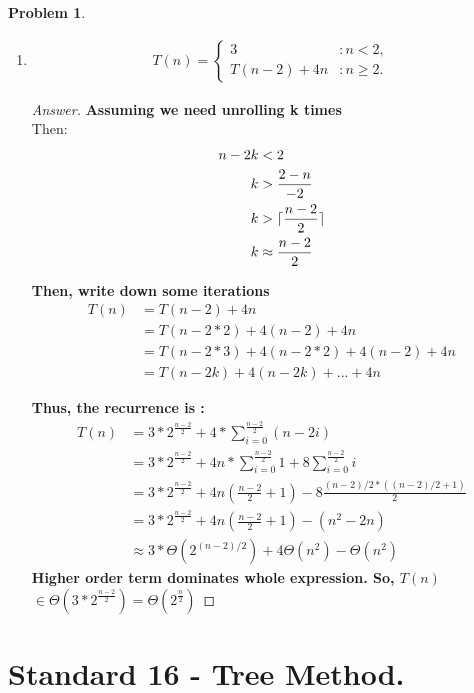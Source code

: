 \documentclass[11pt]{article}
\DeclarePairedDelimiter\ceil{\lceil}{\rceil}
\theoremstyle{definition}
\theoremstyle{definition}
\newtheorem{required}{Problem}
\theoremstyle{definition}
\begin{document}
\begin{required}
\begin{enumerate} [label=(\alph*)]
\newpage
\item
\begin{align*}
T(n) = \begin{cases}
3 & : n < 2, \\
T(n-2) + 4n & : n \geq 2.
\end{cases}
\end{align*}

\begin{proof}[Answer]
\textbf{Assuming we need unrolling k times\\}
Then:\\
\begin{align*}
n-2k &< 2 \\
k &>  \frac {2-n}{-2}\\
k &> \ceil{\frac{n-2}{2}}\\
k &\approx \frac{n-2}{2}
\end{align*}

\textbf{Then, write down some iterations\\}
\begin{align*}
T(n) &= T(n-2)+4n\\
&= T(n-2*2) + 4(n-2) + 4n\\
&= T(n-2*3) + 4(n-2*2) + 4(n-2) + 4n\\
&= T(n-2k) + 4(n-2k) + ... + 4n
\end{align*}

\textbf{Thus, the recurrence is :\\ }
\begin{align*}
T(n) &= 3 * 2^{\frac{n-2}{2}} +4 *  \sum_{i=0}^{\frac{n-2}{2}} (n-2i)\\
&=  3 * 2^{\frac{n-2}{2}} + 4n * \sum_{i=0}^{\frac{n-2}{2}} 1 +8\sum_{i=0}^{\frac{n-2}{2}} i\\
&=  3 * 2^{\frac{n-2}{2}} + 4n(\frac{n-2}{2} + 1) -8 \frac{(n-2)/2 * ((n-2)/2 + 1)}{2} \\
&=  3 * 2^{\frac{n-2}{2}} + 4n(\frac{n-2}{2} + 1) - (n^2 - 2n)\\
&\approx  3*\Theta(2^{(n-2)/2}) + 4\Theta(n^2) - \Theta(n^2) 
\end{align*}
\textbf{Higher order term dominates whole expression. So, $T(n)$ $\in \Theta(3*2^{\frac{n-2}{2}}) = \Theta(2^{\frac{n}{2}})$} 
\end{proof}
\end{enumerate}

\end{required}

\newpage
\section{Standard 16 - Tree Method.}
\end{document}
